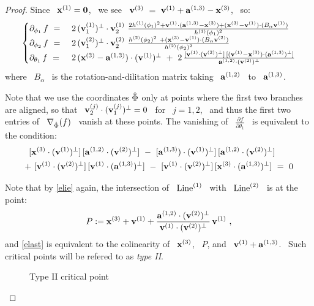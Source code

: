 \begin{proof}
Since \ $\mathbf{x}\sp{({1})}=\mathbf{0}$, \ we see \ $\mathbf{v}\sp{({3})}~=~\mathbf{v}\sp{({1})}+\mathbf{a}\sp{({1,3})}-\mathbf{x}\sp{({3})}$, \ so:
%
\begin{equation}\label{eqmorse}
\begin{cases}
\dif{f}{\phi_{1}}~=&~
2\,\vpp{1}~\frac{2\hj{1}(\phi_{1})^{2}+\vj{1}\cdot(\aj{1,3}-\xj{3})+
(\xj{3}-\vj{1})\cdot(B_{\alpha}\vj{1})}{\hj{1}(\phi_{1})^{2}}\\
%
\dif{f}{\phi_{2}}~=&~
2\,\vpp{2}~
\frac{\hj{2}(\phi_{2})^{2}~+(\xj{3}-\vj{1})\cdot(B_{\alpha}\vj{2})}
{\hj{2}(\phi_{2})^{2}}\\
%
\dif{f}{\theta_{1}}~=&~
2\,(\xj{3}-\aj{1,3})\cdot\vp{1}
~+~2\,\frac{[\vj{1}\cdot\vp{2}]\,[(\vj{1}-\xj{3})\cdot(\aj{1,3})^{\perp}]}
{\aj{1,2}\cdot\vp{2}}
\end{cases}
%
\end{equation}
%
where \ $B_{\alpha}$ \ is the rotation-and-dilitation matrix taking \
$\mathbf{a}\sp{({1,2})}$ \ to \ $\mathbf{a}\sp{({1,3})}$.

Note that we use the coordinates $\hat{\Phi}$ only at points where the first
two branches are aligned, so that \
$\mathbf{v}\sp{({j})}_{2}\cdot(\mathbf{v}\sp{({j})}_{1})^{\perp}=0$ \ for \ $j=1,2$, \ and thus
the first two entries of \ $\nabla_{\hat{\Phi}}(f)$ \ vanish at these
points. The vanishing of \ $\frac{\partial f}{\partial\theta_{1}}$ \
is equivalent to the condition:
%
\begin{equation}\label{elast}
%
\begin{split}
%
[&\xj{3}\cdot\vp{1}]\,[\aj{1,2}\cdot\vp{2}]
~-~[\aj{1,3})\cdot\vp{1}]\,[\aj{1,2}\cdot\vp{2}]\\
+&~[\vj{1}\cdot\vp{2}]\,[\vj{1}\cdot(\aj{1,3})^{\perp}]~-~
[\vj{1}\cdot\vp{2}]\,[\xj{3}\cdot(\aj{1,3})^{\perp}]~=~0
%
\end{split}
%
\end{equation}
%

Note that by \eqref{elie} again, the intersection of \ $\operatorname{Line}\sp{({1})}$ \
with \ $\operatorname{Line}\sp{({2})}$ \ is at the point:
$$
P:=\mathbf{x}\sp{({3})}+\mathbf{v}\sp{({1})}+\frac{\mathbf{a}\sp{({1,2})}\cdot(\mathbf{v}\sp{({2})})^{\perp}}{\mathbf{v}\sp{({1})}\cdot(\mathbf{v}\sp{({2})})^{\perp}}\,\mathbf{v}\sp{({1})}~,
$$
%
and \eqref{elast} is equivalent to the colinearity of \ $\mathbf{x}\sp{({3})}$, \
$P$, and \ $\mathbf{v}\sp{({1})}+\mathbf{a}\sp{({1,3})}$. \ Such critical points
will be refered to as \emph{type II}.

\begin{figure}[htbp]
\begin{center}
\epsfysize=5cm %
\leavevmode {} \caption{Type II
critical point}\label{fcaseII}
\end{center}
\end{figure}


\end{proof}
